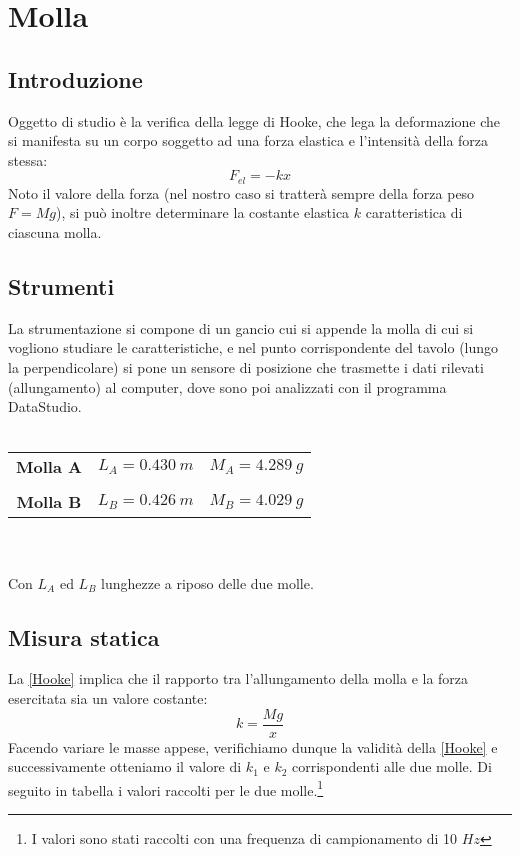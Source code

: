 
\chapter{Molla}

\section{Introduzione}
Oggetto di studio è la verifica della legge di Hooke, che lega la deformazione che si manifesta su un corpo soggetto ad una forza elastica e l'intensità della forza stessa:
\begin{equation}\label{Hooke}
F_{el}=-kx
\end{equation}
Noto il valore della forza (nel nostro caso si tratterà sempre della forza peso $F=Mg$), si può inoltre determinare la costante elastica $k$ caratteristica di ciascuna molla.

\section{Strumenti}
La strumentazione si compone di un gancio cui si appende la molla di cui si vogliono studiare le caratteristiche, e nel punto corrispondente del tavolo (lungo la perpendicolare) si pone un sensore di posizione che trasmette i dati rilevati (allungamento) al computer, dove sono poi analizzati con il programma DataStudio.\\
\\
\begin{tabular}{c c c}
\textbf{Molla A} & \hspace{1.5cm} $L_A=0.430\ m$ & \hspace{1.5cm} $M_A=4.289\ g$\\
\\
\textbf{Molla B} & \hspace{1.5cm} $L_B=0.426\ m$ & \hspace{1.5cm} $M_B=4.029\ g$\\
\end{tabular}
\\
\\
Con $L_A$ ed $L_B$ lunghezze a riposo delle due molle.

\section{Misura statica}

La \ref{Hooke} implica che il rapporto tra l'allungamento della molla e la forza esercitata sia un valore costante:
$$k=\frac{Mg}{x}$$
Facendo variare le masse appese, verifichiamo dunque la validità della \ref{Hooke} e successivamente otteniamo il valore di $k_1$ e $k_2$ corrispondenti alle due molle.   
Di seguito in tabella i valori raccolti per le due molle.\footnote{I valori sono stati raccolti con una frequenza di campionamento di 10 $Hz$}

